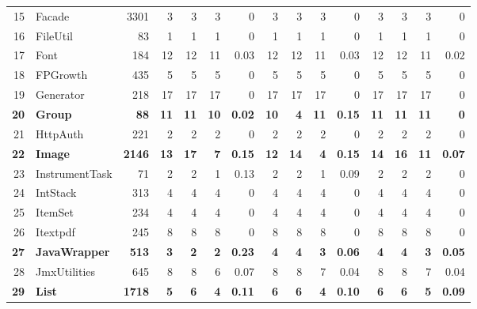 \begin{table} [htp!]
{\begin{tabularx}{1 \textwidth}{r l r r r r r r r r r r r r r}
15						& Facade					&3301		& 3		&	3	&	3	& 	0					& 3		& 3 		& 3		& 		0			& 3			& 3			& 3			&	0\\   
16						& FileUtil					&83			& 1		&	1	&	1	& 	0					& 1		& 1 		& 1		& 		0			& 1			& 1			& 1			&	0\\      
17						& Font					&184		&12		&	12	&	11	& 	0.03					& 12		& 12 		& 11		& 		0.03			& 12			& 12			& 11			&	0.02\\        
18						& FPGrowth				&435		& 5		&	5	&	5	& 	0					& 5		&  5		& 5		& 		0			& 5			& 5			& 5			&	0	\\       
19						& Generator				&218		& 17		&	17	&	17	& 	0					& 17		& 17 		& 17		& 		0			& 17			& 17			& 17			&	0	\\      
\textbf{20}						& \textbf{Group}					&\textbf{88}			& \textbf{11}		&	\textbf{11}	&	\textbf{10}	& 	\textbf{0.02}					& \textbf{10}		& \textbf{4} 		& \textbf{11}		& 		\textbf{0.15}			& \textbf{11}			& \textbf{11}			& \textbf{11}			&	\textbf{0}	\\      
21						& HttpAuth				&221		& 2		&	2	&	2	& 	0					& 2		& 2 		& 2		& 		0			& 2			& 2			& 2			&	0	\\         
\textbf{22}						& \textbf{Image}					&\textbf{2146}		& \textbf{13}		&	\textbf{17}	&	\textbf{7}	& 	\textbf{0.15}					& \textbf{12}		& \textbf{14} 		& \textbf{4}	& 		\textbf{0.15}			& \textbf{14}			& \textbf{16}			& \textbf{11}			&	\textbf{0.07}\\        
23						& InstrumentTask			&71			& 2		&	2	&	1	& 	0.13					& 2		& 2 		& 1		& 		0.09			& 2			& 2			& 2			&	0	\\    
24						& IntStack					&313		& 4		&	4	&	4	& 	0					& 4		& 4 		& 4		& 		0			& 4			& 4			& 4			&	0	\\      
25						& ItemSet					&234		& 4		&	4	&	4	& 	0					& 4		& 4 		& 4		& 		0			& 4			& 4			& 4			&	0	\\       
26						& Itextpdf					&245		& 8		&	8	&	8	& 	0					& 8		&  8		& 8		& 		0			& 8			& 8			& 8			&	0\\      
\textbf{27}						& \textbf{JavaWrapper}				&\textbf{513}		&\textbf{3}		&	\textbf{2}	&	\textbf{2}	& 	\textbf{0.23}					& \textbf{4}		& \textbf{4} 		& \textbf{3}		& 		\textbf{0.06}			& \textbf{4}			& \textbf{4}			& \textbf{3}			&	\textbf{0.05}\\      
28						& JmxUtilities				&645		& 8		&	8	&	6	& 	0.07					& 8		& 8 		& 7		& 		0.04			& 8			& 8			& 7			&	0.04\\      
\textbf{29}						& \textbf{List}					&\textbf{1718}		& \textbf{5}		&	\textbf{6}	&	\textbf{4}	& 	\textbf{0.11}					& \textbf{6}		& \textbf{6} 		& \textbf{4}		& 		\textbf{0.10}			&\textbf{6}			& \textbf{6}			& \textbf{5}			&	\textbf{0.09}\\      

\end{tabularx}}
\end{table}

